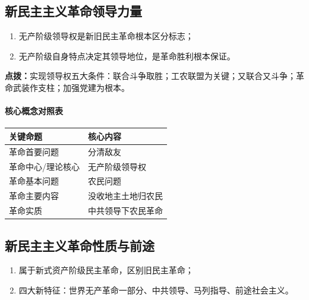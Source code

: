\subsection{新民主主义革命领导力量}
\begin{enumerate}
    \item 无产阶级领导权是新旧民主革命根本区分标志；
    \item 无产阶级自身特点决定其领导地位，是革命胜利根本保证。
\end{enumerate}
\vspace{0.4em}
\noindent\sloppy\colorbox{orange!10}{
    \begin{minipage}{0.92\textwidth}
        \textbf{点拨：}实现领导权五大条件：联合斗争取胜；工农联盟为关键；又联合又斗争；革命武装作支柱；加强党建为根本。
    \end{minipage}
}
\vspace{0.4em}

\paragraph{核心概念对照表}
\begin{center}
\begin{tabularx}{0.95\textwidth}{|>{\centering\arraybackslash}X|>{\centering\arraybackslash}X|}
\hline
\rowcolor{orange!10} 关键命题 & 核心内容 \\
\hline
革命首要问题 & 分清敌友 \\
\hline 革命中心/理论核心 & 无产阶级领导权 \\
\hline 革命基本问题 & 农民问题 \\
\hline 革命主要内容 & 没收地主土地归农民 \\
\hline 革命实质 & 中共领导下农民革命 \\
\hline
\end{tabularx}
\end{center}

\subsection{新民主主义革命性质与前途}
\begin{enumerate}
    \item 属于新式资产阶级民主革命，区别旧民主革命；
    \item 四大新特征：世界无产革命一部分、中共领导、马列指导、前途社会主义。
\end{enumerate}

